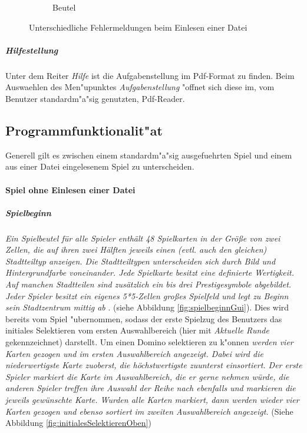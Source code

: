 \begin{figure}
\begin{subfigure}[b]{0.35\textwidth}
            \caption[]%
            {{\small Beutel}}    
            \label{fig:BeutelErr}
        \end{subfigure}
        \caption
        {\small Unterschiedliche Fehlermeldungen beim Einlesen einer Datei} 
        \label{fig:Fehleruebersicht}
    \end{figure}

\subparagraph{Hilfestellung}
Unter dem Reiter \emph{Hilfe} ist die Aufgabenstellung im Pdf-Format zu finden. Beim Auswaehlen des Men"upunktes \emph{Aufgabenstellung} "offnet sich diese im, vom Benutzer standardm"a"sig genutzten, Pdf-Reader. 


\subsection{Programmfunktionalit"at}
Generell gilt es zwischen einem standardm"a"sig ausgefuehrten Spiel und einem aus einer Datei eingelesenem Spiel zu unterscheiden. 

\paragraph{Spiel ohne Einlesen einer Datei}
\subparagraph{Spielbeginn}
\emph{Ein Spielbeutel für alle Spieler enthält 48 Spielkarten in der Größe von zwei Zellen, die auf ihren zwei Hälften jeweils einen (evtl. auch den gleichen) Stadtteiltyp anzeigen. Die Stadtteiltypen unterscheiden sich durch Bild und Hintergrundfarbe voneinander. Jede Spielkarte besitzt eine definierte Wertigkeit. Auf manchen Stadtteilen sind zusätzlich ein bis drei Prestigesymbole abgebildet. Jeder Spieler besitzt ein eigenes 5*5-Zellen großes Spielfeld und legt zu Beginn sein Stadtzentrum mittig ab}
\cite{aufgabenstellung}. 
(siehe Abbildung \ref{fig:spielbeginnGui}). Dies wird bereits vom Spiel "ubernommen, sodass der erste Spielzug des Benutzers das initiales Selektieren vom ersten Auswahlbereich (hier mit \emph{Aktuelle Runde} gekennzeichnet) darstellt. Um einen Domino selektieren zu k"onnen \emph{werden vier Karten gezogen und im ersten Auswahlbereich angezeigt. Dabei wird die niederwertigste Karte zuoberst, die höchstwertigste zuunterst einsortiert. Der erste Spieler markiert die Karte im Auswahlbereich, die er gerne nehmen würde, die anderen Spieler treffen ihre Auswahl der Reihe nach ebenfalls und markieren die jeweils gewünschte Karte. Wurden alle Karten markiert, dann werden wieder vier Karten gezogen und ebenso sortiert im zweiten Auswahlbereich angezeigt.} 
\cite{aufgabenstellung}
(Siehe Abbildung \ref{fig:initialesSelektierenOben})

